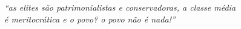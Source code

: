

\begin{epigrafe}
	\vspace*{\fill}
	\begin{flushright}
		\textit{``as  elites são patrimonialistas e conservadoras, a classe média \\ é meritocrática e o povo? o povo não é nada!''}
	\end{flushright}
\end{epigrafe}


